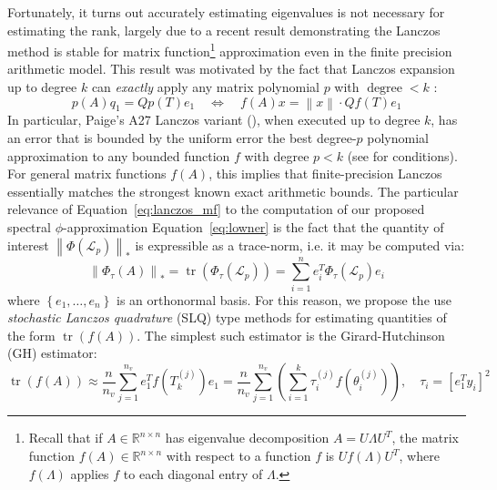 \documentclass[pdflatex,sn-mathphys-num]{sn-jnl}
\begin{document}
Fortunately, it turns out accurately estimating eigenvalues is not necessary for estimating the rank, largely due to a recent result demonstrating the Lanczos method is stable for matrix function\footnote{Recall that if \(A \in \mathbb{R}^{n \times n}\) has eigenvalue decomposition \(A = U\Lambda U^{T}\), the matrix function \(f(A) \in \mathbb{R}^{n \times n}\) with respect to a function \(f\) is \(Uf(\Lambda)U^{T}\), where \(f(\Lambda)\) applies \(f\) to each diagonal entry of \(\Lambda\).} approximation even in the finite precision arithmetic model. This result was motivated by the fact that Lanczos expansion up to degree \(k\) can \emph{exactly} apply any matrix polynomial \(p\) with \(\operatorname{degree} < k\) \cite{musco2018stability}:
\[\label{eq:lanczos_mf}
	p(A)q_{1} = Qp(T)e_{1} \quad \Leftrightarrow \quad f(A)x = \left\| x \right\| \cdot Qf(T)e_{1}
\]
\noindent In particular, Paige's A27 Lanczos variant (\cite{paige1972computational}), when executed up to degree \(k\), has an error that is bounded by the uniform error the best degree-\(p\) polynomial approximation to any bounded function \(f\) with degree \(p < k\) (see \cite{musco2018stability} for conditions). For general matrix functions \(f(A)\), this implies that finite-precision Lanczos essentially matches the strongest known exact arithmetic bounds. The particular relevance of Equation~\ref{eq:lanczos_mf} to the computation of our proposed spectral \(\phi\)-approximation Equation~\ref{eq:lowner} is the fact that the quantity of interest \(\left\| {\Phi(\mathcal{L}_{p})} \right\|_{\ast}\) is expressible as a trace-norm, i.e. it may be computed via: 
\[
\left\| {\Phi_{\tau}(A)} \right\|_{\ast} = \operatorname{tr}\left( \Phi_{\tau}\left( \mathcal{L}_{p} \right) \right) = \sum_{i = 1}^{n}e_{i}^{T}\Phi_{\tau}\left( \mathcal{L}_{p} \right)e_{i}
\] 
where \(\left\{ e_{1},\ldots,e_{n} \right\}\) is an orthonormal basis. For this reason, we propose the use \emph{stochastic Lanczos quadrature} (SLQ) type methods \cite{ubaru2016fast} for estimating quantities of the form \(\operatorname{tr}\left( f(A) \right)\). The simplest such estimator is the Girard-Hutchinson (GH) estimator:
\[\label{eq:gh_trace_estimator}
\operatorname{tr}\left( f(A) \right) \approx \frac{n}{n_{v}}\sum_{j = 1}^{n_{v}}e_{1}^{T}f\left. \left( T_{k}^{(j)} \right) \right.e_{1} = \frac{n}{n_{v}}\sum_{j = 1}^{n_{v}}\left. \left( \sum_{i = 1}^{k}\tau_{i}^{(j)}f\left. \left( \theta_{i}^{(j)} \right) \right. \right) \right.,\quad\tau_{i} = \left. \left\lbrack e_{1}^{T}y_{i} \right\rbrack \right.^{2}
\]
\end{document}
